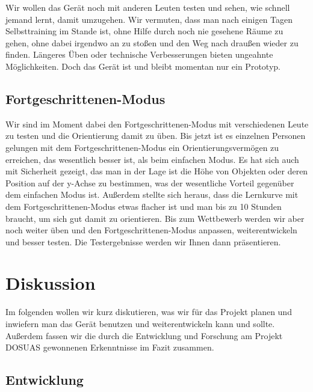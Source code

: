\documentclass[a4paper,12pt,ngerman]{scrartcl}
\begin{document}
Wir wollen das Gerät noch mit
anderen Leuten testen und sehen, wie schnell jemand lernt, damit umzugehen. Wir vermuten, dass man nach einigen 
Tagen Selbsttraining im Stande ist, ohne Hilfe durch noch nie gesehene Räume zu gehen, ohne dabei irgendwo an zu
stoßen und den Weg nach draußen wieder zu finden. Längeres Üben oder technische Verbesserungen bieten ungeahnte
Möglichkeiten. Doch das Gerät ist und bleibt momentan nur ein Prototyp. 

\subsection{Fortgeschrittenen-Modus}

Wir sind im Moment dabei den Fortgeschrittenen-Modus mit verschiedenen Leute zu testen und die Orientierung damit zu üben. Bis jetzt
ist es einzelnen Personen gelungen mit dem Fortgeschrittenen-Modus ein Orientierungsvermögen zu erreichen, das wesentlich besser ist, als
beim einfachen Modus. Es hat sich auch mit Sicherheit gezeigt, das man in der Lage ist die Höhe von Objekten oder deren Position auf der
y-Achse zu bestimmen, was der wesentliche Vorteil gegenüber dem einfachen Modus ist. Außerdem stellte sich heraus, dass die Lernkurve mit
dem Fortgeschrittenen-Modus etwas flacher ist und man bis zu 10 Stunden braucht, um sich gut damit zu orientieren. Bis zum Wettbewerb werden wir aber noch weiter üben und den Fortgeschrittenen-Modus anpassen, weiterentwickeln und besser testen. Die Testergebnisse werden wir 
Ihnen dann präsentieren.

\newpage

\section{Diskussion}

Im folgenden wollen wir kurz diskutieren, was wir für das Projekt planen und inwiefern man das
Gerät benutzen und weiterentwickeln kann und sollte. Außerdem fassen wir die durch die Entwicklung und Forschung am Projekt DOSUAS gewonnenen Erkenntnisse im Fazit zusammen.

\subsection{Entwicklung}
\end{document}
